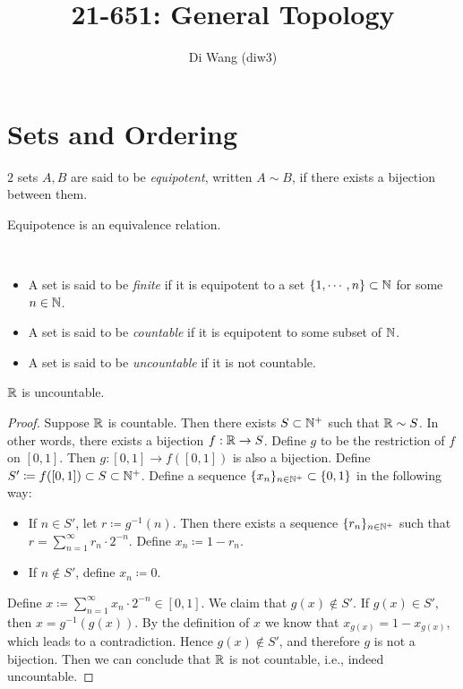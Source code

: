 \documentclass{techreport}
\begin{document}
\title{21-651: General Topology}
\author{Di Wang (diw3)}
\maketitle

\section{Sets and Ordering}

\begin{definition}
	$2$ sets $A,B$ are said to be \emph{equipotent}, written $A \sim B$, if there exists a bijection between them.
\end{definition}

\begin{remark}
	Equipotence is an equivalence relation.
\end{remark}

\begin{definition}\
	\begin{itemize}
		\item A set is said to be \emph{finite} if it is equipotent to a set $\{1,\cdots,n\} \subset \mathbb{N}$ for some $n \in \mathbb{N}$.
		\item A set is said to be \emph{countable} if it is equipotent to some subset of $\mathbb{N}$.
		\item A set is said to be \emph{uncountable} if it is not countable.
	\end{itemize}
\end{definition}

\begin{remark}
	$\mathbb{R}$ is uncountable.
\end{remark}
\begin{proof}
	Suppose $\mathbb{R}$ is countable.
	Then there exists $S \subset \mathbb{N}^+$ such that $\mathbb{R} \sim S$.
	In other words, there exists a bijection $f : \mathbb{R} \to S$.
	Define $g$ to be the restriction of $f$ on $[0,1]$.
	Then $g : [0,1] \to f([0,1])$ is also a bijection.
	Define $S' \coloneqq f([0,1]) \subset S \subset \mathbb{N}^+$.
	Define a sequence $\{x_n\}_{n \in \mathbb{N}^+} \subset \{0,1\}$ in the following way:
	\begin{itemize}
		\item If $n \in S'$, let $r \coloneqq g^{-1}(n)$.
		Then there exists a sequence $\{ r_n\}_{n \in \mathbb{N}^+}$ such that $r = \sum_{n=1}^\infty r_n \cdot 2^{-n}$.
		Define $x_n \coloneqq 1 - r_n$.
		\item If $n \not\in S'$, define $x_n \coloneqq 0$.
	\end{itemize}
	Define $x \coloneqq \sum_{n=1}^\infty x_n \cdot 2^{-n} \in [0,1]$.
	We claim that $g(x) \not\in S'$.
	If $g(x) \in S'$, then $x = g^{-1}(g(x))$. By the definition of $x$ we know that $x_{g(x)} = 1-x_{g(x)}$, which leads to a contradiction.
	Hence $g(x) \not\in S'$, and therefore $g$ is not a bijection.
	Then we can conclude that $\mathbb{R}$ is not countable, i.e., indeed uncountable.
\end{proof}
\end{document}
